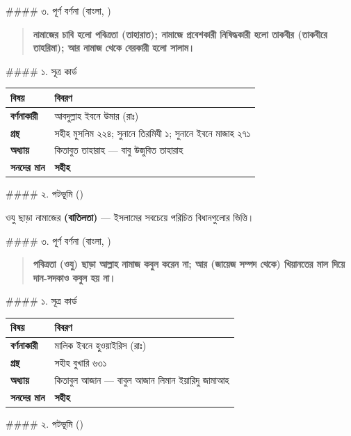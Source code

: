 \#\#\#\# ৩. পূর্ণ বর্ণনা (বাংলা, )

\begin{quote}
\textbf{নামাজের চাবি হলো পবিত্রতা (তাহারাত); নামাজে প্রবেশকারী নিষিদ্ধকারী হলো তাকবীর (তাকবীরে তাহরিমা); আর নামাজ থেকে বেরকারী হলো সালাম।}
\end{quote}

\#\#\#\# ১. সূত্র কার্ড

\begin{table}[h]\centering\small
\begin{tabular}{ll}
বিষয় & বিবরণ \\
\hline
\textbf{বর্ণনাকারী} & আবদুল্লাহ ইবনে উমার (রাঃ) \\
\textbf{গ্রন্থ} & সহীহ মুসলিম ২২৪; সুনানে তিরমিযী ১; সুনানে ইবনে মাজাহ ২৭১ \\
\textbf{অধ্যায়} & কিতাবুত তাহারাহ — বাবু উজুবিত তাহারাহ \\
\textbf{সনদের মান} & \textbf{সহীহ} \\
\hline
\end{tabular}
\end{table}

\#\#\#\# ২. পটভূমি ()

ওযু ছাড়া নামাজের \textbf{ (বাতিলতা)} — ইসলামের সবচেয়ে পরিচিত বিধানগুলোর ভিত্তি।

\#\#\#\# ৩. পূর্ণ বর্ণনা (বাংলা, )

\begin{quote}
\textbf{পবিত্রতা (ওযু) ছাড়া আল্লাহ নামাজ কবুল করেন না; আর (জায়েজ সম্পদ থেকে) খিয়ানতের মাল দিয়ে দান-সদকাও কবুল হয় না।}
\end{quote}

\#\#\#\# ১. সূত্র কার্ড

\begin{table}[h]\centering\small
\begin{tabular}{ll}
বিষয় & বিবরণ \\
\hline
\textbf{বর্ণনাকারী} & মালিক ইবনে হুওয়াইরিস (রাঃ) \\
\textbf{গ্রন্থ} & সহীহ বুখারি ৬৩১ \\
\textbf{অধ্যায়} & কিতাবুল আজান — বাবুল আজান লিমান ইয়ারিদু জামাআহ \\
\textbf{সনদের মান} & \textbf{সহীহ} \\
\hline
\end{tabular}
\end{table}

\#\#\#\# ২. পটভূমি ()

